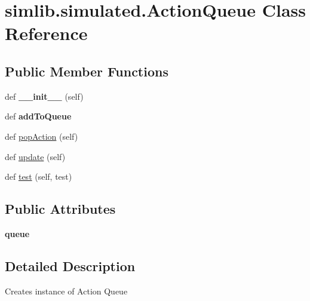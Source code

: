 \hypertarget{classsimlib_1_1simulated_1_1_action_queue}{}\section{simlib.\+simulated.\+Action\+Queue Class Reference}
\label{classsimlib_1_1simulated_1_1_action_queue}
\subsection*{Public Member Functions}
\begin{DoxyCompactItemize}
\item 
\mbox{\label{classsimlib_1_1simulated_1_1_action_queue_aa1ba98000ab1a4224d9036678b9404d4}} 
def {\bfseries \+\_\+\+\_\+init\+\_\+\+\_\+} (self)
\item 
\mbox{\label{classsimlib_1_1simulated_1_1_action_queue_ad3b4d3efb217b9624fb98f602b5bd86a}} 
def {\bfseries add\+To\+Queue}
\item 
def \mbox{\hyperlink{classsimlib_1_1simulated_1_1_action_queue_a7910d8cb9b8a6c40fb86a39390c76d17}{pop\+Action}} (self)
\item 
def \mbox{\hyperlink{classsimlib_1_1simulated_1_1_action_queue_a81ac500fc4a41ee0fd8e75b2daa3269f}{update}} (self)
\item 
def \mbox{\hyperlink{classsimlib_1_1simulated_1_1_action_queue_a4acc91e65e6844b9241436593bcb68c2}{test}} (self, test)
\end{DoxyCompactItemize}
\subsection*{Public Attributes}
\begin{DoxyCompactItemize}
\item 
\mbox{\label{classsimlib_1_1simulated_1_1_action_queue_ad16b72be1173c076a377ad76b105616d}} 
{\bfseries queue}
\end{DoxyCompactItemize}


\subsection{Detailed Description}
\begin{DoxyVerb}Creates instance of Action Queue
\end{DoxyVerb}
 

